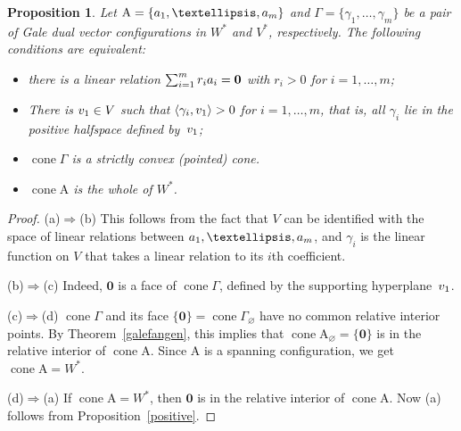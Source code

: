 \documentclass[a4paper]{amsart}
\newtheorem{proposition}[theorem]{Proposition}
\theoremstyle{definition}
\theoremstyle{remark}
\numberwithin{equation}{section}
\newcommand{\mb}[1]{{\textbf {\textit#1}}}
\def\cone{\mathop{\mathrm{cone}}}
\newcommand{\<}{\langle}
\renewcommand{\>}{\rangle}
\begin{document}
\begin{proposition}\label{posit}
Let $\mathrm A=\{\mb a_1,\ldots,\mb a_m\}$ and $\Gamma=\{\gamma_1,\ldots,\gamma_m\}$ be a pair of Gale dual vector configurations in $W^*$ and $V^*$, respectively. The following conditions are equivalent:

\begin{itemize}
\item[(a)] there is a linear relation $\sum_{i=1}^m r_i\mb a_i=\mathbf 0$ with $r_i>0$ for $i=1,\ldots,m$;\\[-0.7\baselineskip]

\item[(b)]
There is $\mb v_1\in V$ such that $\langle\gamma_i,\mb v_1\rangle>0$ for $i=1,\ldots,m$,  that is, all $\gamma_i$ lie in the positive halfspace defined by~$\mb v_1$;\\[-0.7\baselineskip]

\item[(c)] 
$\cone\Gamma$ is a strictly convex (pointed) cone.\\[-0.7\baselineskip]

\item[(d)]
$\cone\mathrm {A}$ is the whole of $W^*$.
\end{itemize}
\end{proposition}

\begin{proof}
(a)$\Rightarrow$(b) This follows from the fact that $V$ can be identified with the space of linear relations between $\mb a_1,\ldots,\mb a_m$, and $\gamma_i$ is the linear function on $V$ that takes a linear relation to its $i$th coefficient.

\smallskip

(b)$\Rightarrow$(c) Indeed, $\mathbf 0$ is a face of $\cone\Gamma$, defined by the supporting hyperplane~$\mb v_1$. 

\smallskip

(c)$\Rightarrow$(d) $\cone\Gamma$ and its face
$\{\mathbf 0\}=\cone\Gamma_\varnothing$ have no common relative interior points. By Theorem~\ref{galefangen}, this implies that 
$\cone\mathrm{A}_\varnothing=\{\mathbf 0\}$ is in the relative interior of 
$\cone\mathrm {A}$. Since $\mathrm{A}$ is a spanning configuration, we get 
$\cone\mathrm{A}=W^*$.

(d)$\Rightarrow$(a) If $\cone\mathrm {A}=W^*$, then $\mathbf 0$ is in the relative interior of $\cone\mathrm {A}$. Now (a) follows from Proposition~\ref{positive}.
\end{proof}
\end{document}
